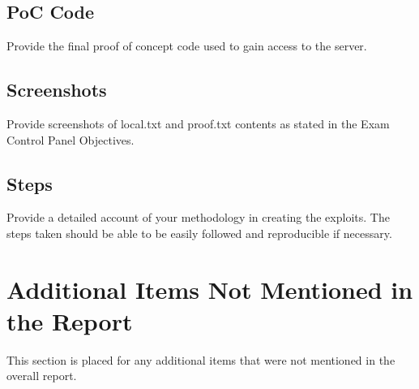 \documentclass[a4paper]{article}
\begin{document}
\subsection{PoC Code}
Provide the final proof of concept code used to gain access to the server.

\subsection{Screenshots}
Provide screenshots of local.txt and proof.txt contents as stated in the Exam Control Panel Objectives.

\subsection{Steps}
Provide a detailed account of your methodology in creating the exploits. The steps taken should be able to be easily followed and reproducible if necessary.

\section{Additional Items Not Mentioned in the Report}
This section is placed for any additional items that were not mentioned in the overall report.
\end{document}
